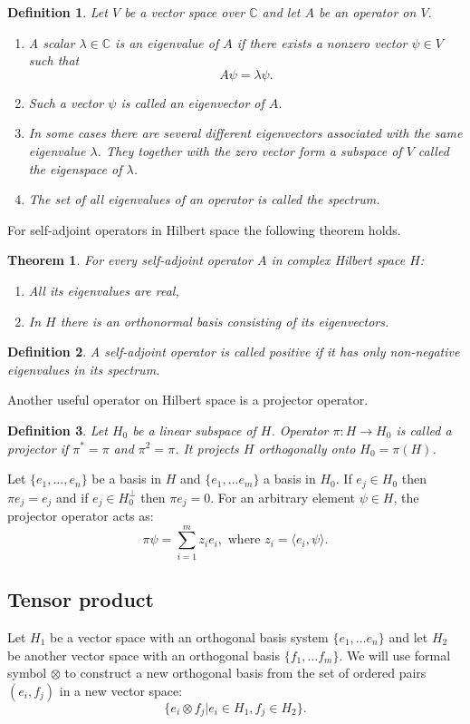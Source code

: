 \documentclass[%
master,         %
subf,           %
href,           %
colorlinks=true %
]{disser}
\numberwithin{equation}{section}
\numberwithin{figure}{section}
\newtheorem{theorem}{Theorem}[section]
\newtheorem{definition}{Definition}[section]
\begin{document}
\begin{definition}
Let $V$ be a vector space over $\mathbb{C}$ and let $A$ be an operator on $V$.
\begin{enumerate}
\item A scalar $\lambda\in \mathbb{C}$ is an eigenvalue of $A$ if there exists a nonzero vector $\psi\in V$ such that
\[
A\psi = \lambda\psi.
\]
\item Such a vector $\psi$ is called an eigenvector of $A$.
\item In some cases there are several different eigenvectors associated with the same eigenvalue $\lambda$. They together with the zero vector form a subspace of $V$ called the eigenspace of $\lambda$.
\item The set of all eigenvalues of an operator is called the spectrum.
\end{enumerate}
\end{definition}

For self-adjoint operators in Hilbert space the following theorem holds.
\begin{theorem}
For every self-adjoint operator $A$ in complex Hilbert space $H$:
\begin{enumerate}
\item All its eigenvalues are real,
\item In $H$ there is an orthonormal basis consisting of its eigenvectors.
\end{enumerate}
\end{theorem}

\begin{definition}
A self-adjoint operator is called positive if it has only non-negative eigenvalues in its spectrum.
\end{definition}

Another useful operator on Hilbert space is a projector operator.
\begin{definition}
Let $H_0$ be a linear subspace of $H$. Operator $\pi: H \to H_0$ is called a projector if $\pi^* = \pi$ and $\pi^2 = \pi$. It projects $H$ orthogonally onto $H_0 = \pi(H)$.
\end{definition}
Let $\{e_1, \ldots, e_n\}$ be a basis in $H$ and $\{e_1, \ldots e_m\}$ a basis in $H_0$. If $e_j \in H_0$ then $\pi e_j = e_j$ and if $e_j\in H_0^\perp$ then $\pi e_j = 0$. For an arbitrary element $\psi\in H$, the projector operator acts as: 
\[
\pi\psi = \sum_{i = 1}^m z_ie_i, \mbox{ where } z_i = \langle e_i, \psi\rangle.
\]

\subsection{Tensor product}
Let $H_1$ be a vector space with an orthogonal basis system $\{e_1, \ldots e_n\}$ and let $H_2$ be another vector space with an orthogonal basis $\{f_1,\ldots f_m\}$. We will use formal symbol $\otimes$ to construct a new orthogonal basis from the set of ordered pairs $(e_i, f_j)$ in a new vector space:
\begin{equation}
\{e_i \otimes f_j | e_i \in H_1, f_j \in H_2\}. \label{eq:tensor_basis}
\end{equation}
\end{document}
